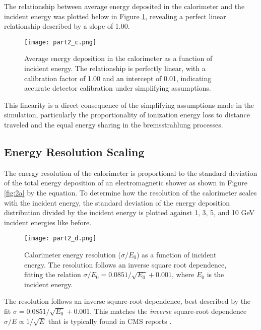 \documentclass[twocolumn]{aastex631}
\begin{document}
The relationship between average energy deposited in the calorimeter and the
incident energy was plotted below in Figure \ref{fig:2c}, revealing a perfect linear relationship described
by a slope of 1.00. 


\begin{figure}[htp]
  \centering
    \texttt{[image: part2\_c.png]}
    \caption{Average energy deposition in the calorimeter as a function of incident
        energy. The relationship is perfectly linear, with a calibration factor
        of 1.00 and an intercept of 0.01, indicating accurate detector
    calibration under simplifying assumptions.}
    \label{fig:2c}
\end{figure}

This linearity is a direct consequence of the simplifying assumptions made in
the simulation, particularly the proportionality of ionization energy loss to
distance traveled and the equal energy sharing in the bremsstrahlung processes.
 
\subsection{Energy Resolution Scaling} 

The energy resolution of the calorimeter is proportional to the standard
deviation of the total energy deposition of an electromagnetic shower as shown
in Figure \ref{fig:2a} by the equation. To determine how the resolution of the calorimeter
scales with the incident energy, the standard deviation of the energy deposition
distribution divided by the incident energy is plotted against 1, 3, 5, and 10 GeV incident energies like
before.

\begin{figure}[htp]
  \centering
    \texttt{[image: part2\_d.png]}
    \caption{Calorimeter energy resolution ($\sigma/E_0$) as a function of incident energy.
        The resolution follows an inverse square root dependence, fitting the relation
        $\sigma/E_0 = 0.085 1/\sqrt{E_0} + 0.001$, where  $E_0$ is the incident
    energy.}
    \label{fig:2d} 
\end{figure}


The resolution follows an inverse square-root dependence, best described by the fit
$\sigma = 0.085 1/\sqrt{E_0} + 0.001$. This matches the
\textit{inverse} square-root dependence $\sigma / E \propto 1/\sqrt{E}$ that is
typically found in CMS reports \citep{CMS2024arXiv2403.15518}. 
\end{document}
